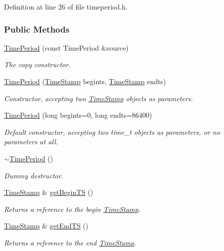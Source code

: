 Definition at line 26 of file timeperiod.h.\subsubsection*{Public Methods}
\begin{CompactItemize}
\item 
\hyperlink{classTimePeriod_TimePerioda0}{Time\-Period} (const Time\-Period \&source)
\begin{CompactList}\small\item\em The copy constructor.\item\end{CompactList}\item 
\hyperlink{classTimePeriod_TimePerioda1}{Time\-Period} (\hyperlink{classTimeStamp}{Time\-Stamp} begints, \hyperlink{classTimeStamp}{Time\-Stamp} endts)
\begin{CompactList}\small\item\em Constructor, accepting two \hyperlink{classTimeStamp}{Time\-Stamp} objects as parameters.\item\end{CompactList}\item 
\hyperlink{classTimePeriod_TimePerioda2}{Time\-Period} (long begints=0, long endts=86400)
\begin{CompactList}\small\item\em Default constructor, accepting two time\_\-t objects as parameters, or no parameters at all.\item\end{CompactList}\item 
\hyperlink{classTimePeriod_TimePerioda3}{$\sim$Time\-Period} ()
\begin{CompactList}\small\item\em Dummy destructor.\item\end{CompactList}\item 
\hyperlink{classTimeStamp}{Time\-Stamp} \& \hyperlink{classTimePeriod_TimePerioda4}{get\-Begin\-TS} ()
\begin{CompactList}\small\item\em Returns a reference to the begin \hyperlink{classTimeStamp}{Time\-Stamp}.\item\end{CompactList}\item 
\hyperlink{classTimeStamp}{Time\-Stamp} \& \hyperlink{classTimePeriod_TimePerioda5}{get\-End\-TS} ()
\begin{CompactList}\small\item\em Returns a reference to the end \hyperlink{classTimeStamp}{Time\-Stamp}.\item\end{CompactList}\item 

\end{CompactItemize}
